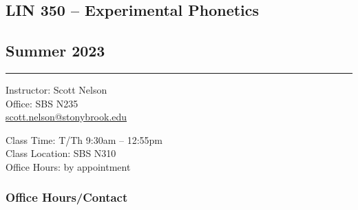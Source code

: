 \documentclass[11pt]{article}
\begin{document}

\noindent\begin{minipage}{.6\linewidth}
	\subsection*{LIN 350 -- Experimental Phonetics}
\end{minipage}
\begin{minipage}{.4\linewidth}
	\begin{flushright}\subsection*{Summer 2023}\end{flushright} 
\end{minipage}

\noindent\rule{\linewidth}{1pt}
\vspace{.2cm}

\noindent\begin{minipage}[t]{.5\linewidth}
	\noindent Instructor: Scott Nelson\\
	Office: SBS N235 \\
	\faEnvelopeO \hspace{1pt} \href{mailto:scott.nelson@stonybrook.edu}{scott.nelson@stonybrook.edu}
\end{minipage}%
\begin{minipage}[t]{.5\linewidth}
	\begin{flushright}
		Class Time: T/Th 9:30am -- 12:55pm \\
		Class Location: SBS N310 \\
		Office Hours: by appointment \\
	\end{flushright}
\end{minipage}
\vspace{.5cm}
\subsubsection*{Office Hours/Contact}
\end{document}
